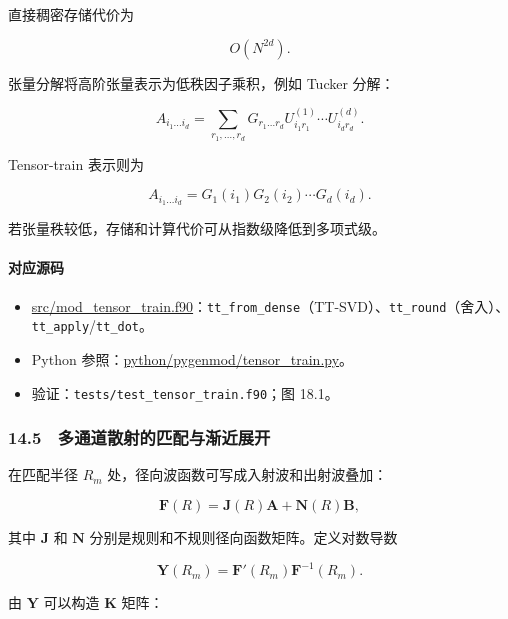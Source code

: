 \documentclass[
]{ctexbook}
\providecommand{\tightlist}{%
  \setlength{\itemsep}{0pt}\setlength{\parskip}{0pt}}
\begin{document}
直接稠密存储代价为

\[
O(N^{2d}).
\]

张量分解将高阶张量表示为低秩因子乘积，例如 Tucker 分解：

\[
A_{i_1\ldots i_d}
=
\sum_{r_1,\ldots,r_d}
G_{r_1\ldots r_d}
U^{(1)}_{i_1r_1}
\cdots
U^{(d)}_{i_dr_d}.
\]

Tensor-train 表示则为

\[
A_{i_1\ldots i_d}
=
G_1(i_1)
G_2(i_2)
\cdots
G_d(i_d).
\]

若张量秩较低，存储和计算代价可从指数级降低到多项式级。

\hypertarget{ux5bf9ux5e94ux6e90ux7801-60}{%
\paragraph{对应源码}\label{ux5bf9ux5e94ux6e90ux7801-60}}

\begin{itemize}
\tightlist
\item
  \href{https://github.com/l1Ha/QuantumGeneralModule/blob/main/src/mod_tensor_train.f90}{src/mod\_tensor\_train.f90}：\texttt{tt\_from\_dense}（TT-SVD）、\texttt{tt\_round}（舍入）、\texttt{tt\_apply}/\texttt{tt\_dot}。
\item
  Python
  参照：\href{https://github.com/l1Ha/QuantumGeneralModule/blob/main/python/pygenmod/tensor_train.py}{python/pygenmod/tensor\_train.py}。
\item
  验证：\texttt{tests/test\_tensor\_train.f90}；图 18.1。
\end{itemize}

\hypertarget{ux591aux901aux9053ux6563ux5c04ux7684ux5339ux914dux4e0eux6e10ux8fd1ux5c55ux5f00}{%
\subsubsection{14.5　多通道散射的匹配与渐近展开}\label{ux591aux901aux9053ux6563ux5c04ux7684ux5339ux914dux4e0eux6e10ux8fd1ux5c55ux5f00}}

在匹配半径 \(R_m\) 处，径向波函数可写成入射波和出射波叠加：

\[
\mathbf F(R)
=
\mathbf J(R)\mathbf A
+
\mathbf N(R)\mathbf B,
\]

其中 \(\mathbf J\) 和 \(\mathbf N\)
分别是规则和不规则径向函数矩阵。定义对数导数

\[
\mathbf Y(R_m)
=
\mathbf F'(R_m)\mathbf F^{-1}(R_m).
\]

由 \(\mathbf Y\) 可以构造 \(\mathbf K\) 矩阵：
\end{document}
